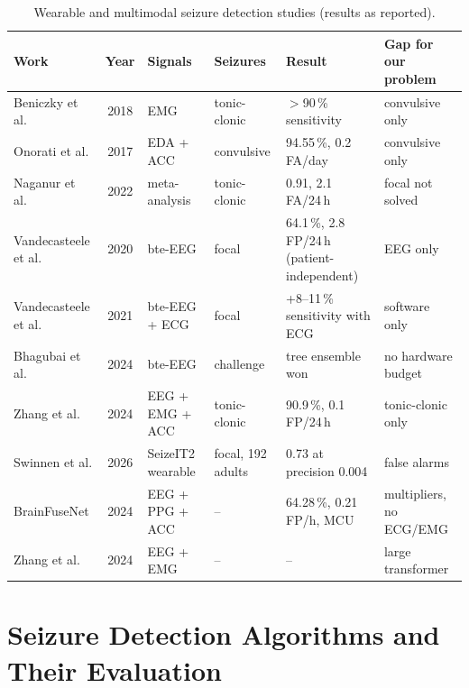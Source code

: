 \begin{table}[htbp]
\centering\small
\caption{Wearable and multimodal seizure detection studies (results as reported).}\label{tab:lit-wearable}
\begin{tabularx}{\textwidth}{@{}P{30mm}cP{22mm}P{22mm}LL@{}}
\toprule
\textbf{Work} & \textbf{Year} & \textbf{Signals} & \textbf{Seizures} & \textbf{Result} & \textbf{Gap for our problem}\\
\midrule
Beniczky et al. \cite{beniczky2018emg} & 2018 & EMG & tonic-clonic & $>$90\,\% sensitivity & convulsive only\\
Onorati et al. \cite{onorati2017empatica} & 2017 & EDA + ACC & convulsive & 94.55\,\%, 0.2 FA/day & convulsive only\\
Naganur et al. \cite{naganur2022meta} & 2022 & meta-analysis & tonic-clonic & 0.91, 2.1 FA/24\,h & focal not solved\\
Vandecasteele et al. \cite{vandecasteele2020bte} & 2020 & bte-EEG & focal & 64.1\,\%, 2.8 FP/24\,h (patient-independent) & EEG only\\
Vandecasteele et al. \cite{vandecasteele2021ecg} & 2021 & bte-EEG + ECG & focal & +8--11\,\% sensitivity with ECG & software only\\
Bhagubai et al. \cite{bhagubai2024challenge} & 2024 & bte-EEG & challenge & tree ensemble won & no hardware budget\\
Zhang et al. \cite{zhang2024tcs} & 2024 & EEG + EMG + ACC & tonic-clonic & 90.9\,\%, 0.1 FP/24\,h & tonic-clonic only\\
Swinnen et al. \cite{swinnen2026seizeit2} & 2026 & SeizeIT2 wearable & focal, 192 adults & 0.73 at precision 0.004 & false alarms\\
BrainFuseNet \cite{ingolfsson2024brainfusenet} & 2024 & EEG + PPG + ACC & -- & 64.28\,\%, 0.21 FP/h, MCU & multipliers, no ECG/EMG\\
Zhang et al. \cite{zhang2024cyclic} & 2024 & EEG + EMG & -- & -- & large transformer\\
\bottomrule
\end{tabularx}
\end{table}

\section{Seizure Detection Algorithms and Their Evaluation}\label{sec:lit-alg}

